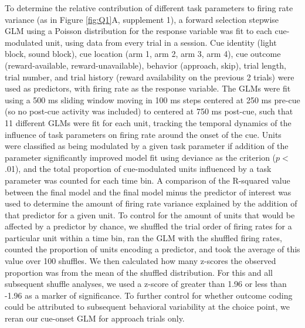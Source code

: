 \documentclass[11pt]{article}
\begin{document}
To determine the relative contribution of different task parameters to firing rate variance (as in Figure \ref{fig:Q1}A, supplement 1), a forward selection stepwise GLM using a Poisson distribution for the response variable was fit to each cue-modulated unit, using data from every trial in a session. Cue identity (light block, sound block), cue location (arm 1, arm 2, arm 3, arm 4), cue outcome (reward-available, reward-unavailable), behavior (approach, skip), trial length, trial number, and trial history (reward availability on the previous 2 trials) were used as predictors, with firing rate as the response variable. The GLMs were fit using a 500 ms sliding window moving in 100 ms steps centered at 250 ms pre-cue (so no post-cue activity was included) to centered at 750 ms post-cue, such that 11 different GLMs were fit for each unit, tracking the temporal dynamics of the influence of task parameters on firing rate around the onset of the cue. Units were classified as being modulated by a given task parameter if addition of the parameter significantly improved model fit using deviance as the criterion ($p <$ .01), and the total proportion of cue-modulated units influenced by a task parameter was counted for each time bin. A comparison of the R-squared value between the final model and the final model minus the predictor of interest was used to determine the amount of firing rate variance explained by the addition of that predictor for a given unit. To control for the amount of units that would be affected by a predictor by chance, we shuffled the trial order of firing rates for a particular unit within a time bin, ran the GLM with the shuffled firing rates, counted the proportion of units encoding a predictor, and took the average of this value over 100 shuffles. We then calculated how many z-scores the observed proportion was from the mean of the shuffled distribution. For this and all subsequent shuffle analyses, we used a z-score of greater than 1.96 or less than -1.96 as a marker of significance. To further control for whether outcome coding could be attributed to subsequent behavioral variability at the choice point, we reran our cue-onset GLM for approach trials only.
\end{document}
